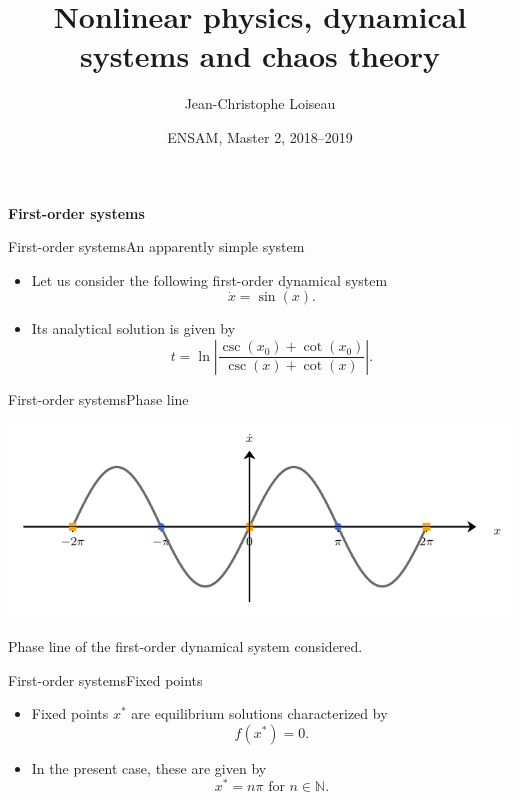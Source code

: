 \documentclass[usenames,dvipsnames,svgnames,10pt,aspectratio=169]{beamer}
\title[Nonlinear Physics] %
{
	Nonlinear physics, dynamical \\ systems and chaos theory
}
\author[J.-Ch.~Loiseau] %
{
	Jean-Christophe Loiseau
}
\institute[unused]
{
	\url{jean-christophe.loiseau@ensam.eu} \\
	DynFluid, \\
	Arts et M\'etiers ParisTech, France
}
\date[unused]{ENSAM, Master 2, 2018--2019}
\begin{document}
\titleframe %


\begin{frame}[t, c]{}
	\centering
	\vspace{1cm}

	{\Large \textbf{First-order systems}}

	\bigskip

	{}

\end{frame}

\begin{frame}[t, c]{First-order systems}{An apparently simple system}
	\begin{itemize}
		\item Let us consider the following first-order dynamical system
		$$
		\dot{x} = \sin(x).
		$$

		\bigskip

		\item Its analytical solution is given by
		$$
		t = \displaystyle \ln \left\vert \frac{\csc(x_0) + \cot(x_0)}{\csc(x) + \cot(x)} \right\vert.
		$$
	\end{itemize}

	\vspace{1cm}
\end{frame}

\begin{frame}[t, c]{First-order systems}{Phase line}
	\centering

	\includegraphics[width=.75\textwidth]{flow_on_the_line}

	\bigskip

	Phase line of the first-order dynamical system considered.

	\vspace{1cm}
\end{frame}

\begin{frame}[t, c]{First-order systems}{Fixed points}
	\begin{itemize}
		\item Fixed points $x^*$ are equilibrium solutions characterized by
		$$
		f(x^*) = 0.
		$$

		\bigskip

		\item In the present case, these are given by
		$$
		x^* = n \pi \text{ for } n \in \mathbb{N}.
		$$
	\end{itemize}

	\vspace{1cm}
\end{frame}
\end{document}
